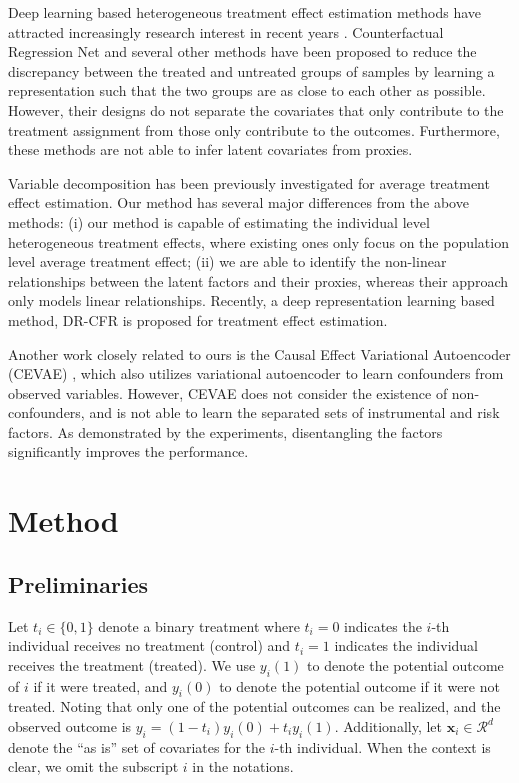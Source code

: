 \documentclass[letterpaper]{article} %
\begin{document}
Deep learning based heterogeneous treatment effect estimation methods have attracted increasingly research interest in recent years \cite{Shalit2016,Alaa2018,Louizos2017,Hassanpour2018,Yao2018_Twin,Yoon2018}. 
Counterfactual Regression Net \cite{Shalit2016} and several other methods \cite{Yao2018_Twin,Hassanpour2018} have been proposed to reduce the discrepancy between the treated and untreated groups of samples by learning a representation such that the two groups are as close to each other as possible.
However, their designs do not separate the covariates that only contribute to the treatment assignment from those only contribute to the outcomes. Furthermore, these methods are not able to infer latent covariates from proxies. 

Variable decomposition \cite{Kun2017,Haeggstroem2017} has been previously investigated for average treatment effect estimation. 
Our method has several major differences from the above methods: (i) our method is capable of estimating the individual level heterogeneous treatment effects, where existing ones only focus on the population level average treatment effect; (ii) we are able to identify the non-linear relationships between the latent factors and their proxies, whereas their approach only models linear relationships. Recently, a deep representation learning based method, DR-CFR \cite{Hassanpour2020} is proposed for treatment effect estimation.

Another work closely related to ours is the Causal Effect Variational Autoencoder (CEVAE) \cite{Louizos2017}, which also utilizes variational autoencoder to learn confounders from observed variables. However, CEVAE does not consider the existence of non-confounders, and is not able to learn the separated sets of instrumental and risk factors. 
As demonstrated by the experiments, disentangling the factors significantly improves the performance.



\section*{Method}

\subsection*{Preliminaries}
Let $t_i \in \{0,1\}$ denote a binary treatment where $t_i = 0$ indicates the $i$-th individual receives no treatment (control) and $t_i = 1$ indicates the individual receives the treatment (treated). We use $y_i(1)$ to denote the potential outcome of $i$ if it were treated, and $y_i(0)$ to denote the potential outcome if it were not treated. Noting that only one of the potential outcomes can be realized, and the observed outcome is $y_i = (1-t_i)y_i(0) + t_i y_i(1)$. Additionally, let $\mathbf{x}_i \in \mathcal{R}^d$ denote the ``as is'' set of covariates for the $i$-th individual. When the context is clear, we omit the subscript $i$ in the notations.
\end{document}
